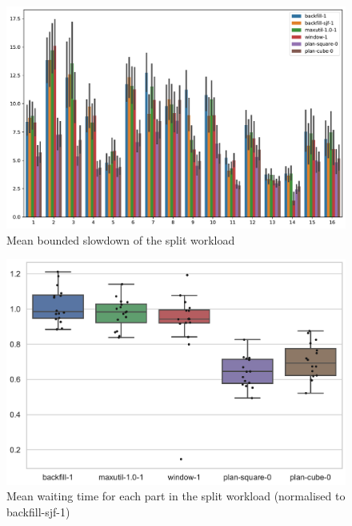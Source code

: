 \documentclass[thesis-en.tex]{subfiles}
\begin{document}
\begin{figure}[p]
    \centering
    \includegraphics[width=\textwidth]{best_io-aware_parts_bounded-slowdown.pdf}
    \caption{Mean bounded slowdown of the split workload}
    \label{fig:best_io-aware_parts_bounded-slowdown}
\end{figure}

\begin{figure}[p]
    \centering
    \includegraphics[width=\textwidth]{best_io-aware_parts_waiting-time_box.pdf}
    \caption{Mean waiting time for each part in the split workload (normalised to backfill-sjf-1)}
    \label{fig:best_io-aware_parts_waiting-time_box}
\end{figure}
\end{document}

